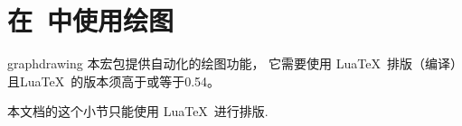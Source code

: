 %
%
%


\section{在\tikzname\ 中使用绘图}

{}

\begin{tikzlibrary}{graphdrawing}
本宏包提供自动化的绘图功能，
它需要使用 Lua\TeX\ 排版（编译）且Lua\TeX\ 的版本须高于或等于0.54。
\end{tikzlibrary}

\ifluatex\else 本文档的这个小节只能使用 Lua\TeX\ 进行排版.\expandafter\endinput\fi


\subsection{选择一个库和输出}

当读者载入|graphdrawing|库时，其绘图引擎已经初始化了。
这个库提供了一些基本的绘图框架，包括前一小节中提到的所有的绘图参数和
绘图关键字。 但是，这个库\emph{并没有}加载任何实质上的绘图算法（程序），
鉴于此，读者需要使用以下在|graphdrawing|库中已定义的命令：

